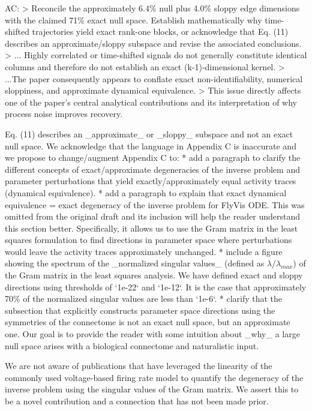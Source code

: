 \documentclass[11pt]{article}
\begin{document}
\begin{markdown}
AC:
> Reconcile the approximately 6.4\% null plus 4.0\% sloppy edge dimensions with the claimed 71\% exact null space. Establish mathematically why time-shifted trajectories yield exact rank-one blocks, or acknowledge that Eq. (11) describes an approximate/sloppy subspace and revise the associated conclusions.
> ... Highly correlated or time-shifted signals do not generally constitute identical columns and therefore do not establish an exact (k-1)-dimensional kernel.
> ...The paper consequently appears to conflate exact non-identifiability, numerical sloppiness, and approximate dynamical equivalence.
> This issue directly affects one of the paper’s central analytical contributions and its interpretation of why process noise improves recovery.

Eq. (11) describes an _approximate_ or _sloppy_ subspace and not an exact null space. We acknowledge that the language in Appendix C is inaccurate and we propose to change/augment Appendix C to:
* add a paragraph to clarify the different concepts of exact/approximate degeneracies of the inverse problem and parameter perturbations that yield exactly/approximately equal activity traces (dynamical equivalence).
* add a paragraph to explain that exact dynamical equivalence = exact degeneracy of the inverse problem for FlyVis ODE. This was omitted from the original draft and its inclusion will help the reader understand this section better. Specifically, it allows us to use the Gram matrix in the least squares formulation to find directions in parameter space where perturbations would leave the activity traces approximately unchanged.
* include a figure showing the spectrum of the _normalized singular values_ (defined as $\lambda / \lambda_{max}$) of the Gram matrix in the least squares analysis. We have defined exact and sloppy directions using thresholds of `1e-22` and `1e-12`. It is the case that approximately 70\% of the normalized singular values are less than `1e-6`.
* clarify that the subsection that explicitly constructs parameter space directions using the symmetries of the connectome is not an exact null space, but an approximate one. Our goal is to provide the reader with some intuition about _why_ a large null space arises with a biological connectome and naturalistic input.

We are not aware of publications that have leveraged the linearity of the commonly used voltage-based firing rate model to quantify the degeneracy of the inverse problem using the singular values of the Gram matrix. We assert this to be a novel contribution and a connection that has not been made prior.

\end{markdown}
\end{document}

